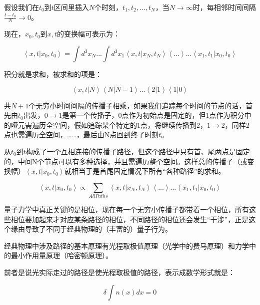 假设我们在$t_0$到$t$区间里插入$N$个时刻，$t_1, t_2, ..., t_N$，当$N \to \infty$时，每相邻时间间隔$\frac{t - t_0}{N} \to 0$。

现在，$x_0,t_0$到$x,t$的变换幅可表示为：

\begin{equation}
\left\langle x,t | x_0, t_0 \right\rangle = \int d^3 x_N ... \int d^3 x_1 \left\langle x, t | x_N, t_N \right\rangle \left\langle  ... \right\rangle ... \left\langle x_1, t_1 | x_0 , t_0 \right\rangle
\end{equation}

积分就是求和，被求和的项是：

\begin{equation*}
\left\langle x,t | N \right\rangle \left\langle N | N-1 \right\rangle ... \left\langle 2 | 1 \right\rangle \left\langle 1 | 0 \right\rangle
\end{equation*}

共$N+1$个无穷小时间间隔的传播子相乘，如果我们追踪每个时间的节点的话，首先由$t_0$出发，$0 \to 1$是第一个传播子，0点作为初始点是固定的，但1点作为积分中的哑元需遍历全空间，假如追踪某个特定的1点，将继续传播到2，$1 \to 2$，同样2点也需遍历全空间，……，最后由N点回到终了时刻$t$。

从$t_0$到$t$构成了一个互相连接的传播子路径，但这个路径中只有首、尾两点是固定的，中间N个节点可以有多种选择，并且需遍历整个空间。这样总的传播子（或变换幅）$\left\langle x,t | x_0, t_0 \right\rangle$就相当于是首尾固定情况下所有“各种路径”的求和。

\begin{equation}
\left\langle x,t | x_0, t_0 \right\rangle \propto \sum\limits_{All Paths} \left\langle x, t | x_N, t_N \right\rangle \left\langle  ... \right\rangle ... \left\langle x_1, t_1 | x_0 , t_0 \right\rangle   
\end{equation}

量子力学中真正关键的是相位，现在每一个无穷小传播子都带着一个相位，所有这些相位要加起来才对应某条路径的相位，不同路径的相位还会发生“干涉”，正是这个缘由导致了不同于经典物理的（丰富的）量子行为。

经典物理中涉及路径的基本原理有光程取极值原理（光学中的费马原理）和力学中的最小作用量原理（哈密顿原理）。

前者是说光实际走过的路径是使光程取极值的路径，表示成数学形式就是：

\begin{equation}
\delta \int n(x) dx = 0 
\end{equation}

